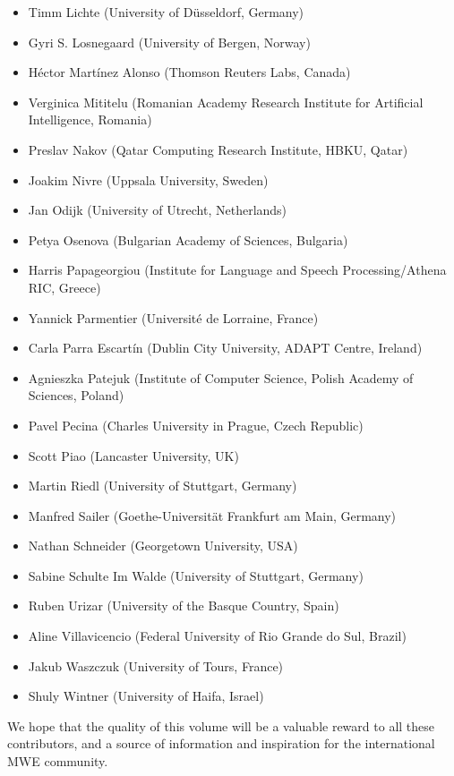 \documentclass[output=paper,
modfonts,
]{langscibook}
\begin{document}
\begin{itemize}
\item Timm Lichte (University of Düsseldorf, Germany)
\item Gyri S. Losnegaard (University of Bergen, Norway)
\item Héctor Martínez Alonso (Thomson Reuters Labs, Canada)
\item Verginica Mititelu (Romanian Academy Research Institute for Artificial Intelligence, Romania)
\item Preslav Nakov (Qatar Computing Research Institute, HBKU, Qatar)
\item Joakim Nivre (Uppsala University, Sweden)
\item Jan Odijk (University of Utrecht, Netherlands)
\item Petya Osenova (Bulgarian Academy of Sciences, Bulgaria)
\item Harris Papageorgiou (Institute for Language and Speech Processing/Athena RIC, Greece)
\item Yannick Parmentier (Université de Lorraine, France)
\item Carla Parra Escartín (Dublin City University, ADAPT Centre, Ireland)
\item Agnieszka Patejuk (Institute of Computer Science, Polish Academy of Sciences, Poland)
\item Pavel Pecina (Charles University in Prague, Czech Republic)
\item Scott Piao (Lancaster University, UK)
\item Martin Riedl (University of Stuttgart, Germany)
\item Manfred Sailer (Goethe-Universität Frankfurt am Main, Germany)
\item Nathan Schneider (Georgetown University, USA)
\item Sabine Schulte Im Walde (University of Stuttgart, Germany)
\item Ruben Urizar (University of the Basque Country, Spain)
\item Aline Villavicencio (Federal University of Rio Grande do Sul, Brazil)
\item Jakub Waszczuk (University of Tours, France)
\item Shuly Wintner (University of Haifa, Israel)
\end{itemize}

We hope that the quality of this volume will be a valuable reward to all these contributors, and a source of information and inspiration for the international MWE community.
\end{document}
